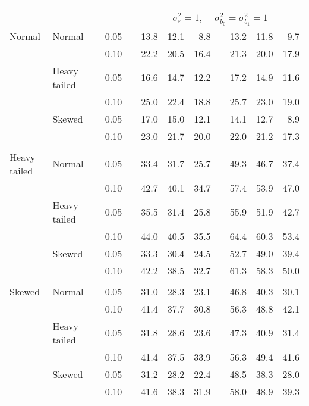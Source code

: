 \begin{table}[ht]
\begin{scriptsize}
\begin{tabular}{ll p{.1cm} c p{.1cm} rrr p{.1cm} rrr}
&&&&&&&&&&&\\
& && && \multicolumn{7}{c}{$\sigma_{\varepsilon}^2 = 1$, \ \ $\sigma_{b_0}^2 = \sigma_{b_1}^2 = 1$} \\ \cline{6-12}
 \rowcolor{gray!20} Normal & Normal &  & 0.05 &  & 13.8 & 12.1 & 8.8 &  & 13.2 & 11.8 & 9.7 \\ 
 \rowcolor{gray!20}  &  &  & 0.10 &  & 22.2 & 20.5 & 16.4 &  & 21.3 & 20.0 & 17.9 \\ 
 \rowcolor{gray!20}  & Heavy tailed &  & 0.05 &  & 16.6 & 14.7 & 12.2 &  & 17.2 & 14.9 & 11.6 \\ 
 \rowcolor{gray!20}  &  &  & 0.10 &  & 25.0 & 22.4 & 18.8 &  & 25.7 & 23.0 & 19.0 \\ 
 \rowcolor{gray!20}  & Skewed &  & 0.05 &  & 17.0 & 15.0 & 12.1 &  & 14.1 & 12.7 & 8.9 \\ 
 \rowcolor{gray!20}  &  &  & 0.10 &  & 23.0 & 21.7 & 20.0 &  & 22.0 & 21.2 & 17.3 \\ 
             &&&&&&&&&&&\\
  Heavy tailed & Normal &  & 0.05 &  & 33.4 & 31.7 & 25.7 &  & 49.3 & 46.7 & 37.4 \\ 
   &  &  & 0.10 &  & 42.7 & 40.1 & 34.7 &  & 57.4 & 53.9 & 47.0 \\ 
   & Heavy tailed &  & 0.05 &  & 35.5 & 31.4 & 25.8 &  & 55.9 & 51.9 & 42.7 \\ 
   &  &  & 0.10 &  & 44.0 & 40.5 & 35.5 &  & 64.4 & 60.3 & 53.4 \\ 
   & Skewed &  & 0.05 &  & 33.3 & 30.4 & 24.5 &  & 52.7 & 49.0 & 39.4 \\ 
   &  &  & 0.10 &  & 42.2 & 38.5 & 32.7 &  & 61.3 & 58.3 & 50.0 \\ 
             &&&&&&&&&&&\\
  Skewed & Normal &  & 0.05 &  & 31.0 & 28.3 & 23.1 &  & 46.8 & 40.3 & 30.1 \\ 
   &  &  & 0.10 &  & 41.4 & 37.7 & 30.8 &  & 56.3 & 48.8 & 42.1 \\ 
   & Heavy tailed &  & 0.05 &  & 31.8 & 28.6 & 23.6 &  & 47.3 & 40.9 & 31.4 \\ 
   &  &  & 0.10 &  & 41.4 & 37.5 & 33.9 &  & 56.3 & 49.4 & 41.6 \\ 
   & Skewed &  & 0.05 &  & 31.2 & 28.2 & 22.4 &  & 48.5 & 38.3 & 28.0 \\ 
   &  &  & 0.10 &  & 41.6 & 38.3 & 31.9 &  & 58.0 & 48.9 & 39.3 \\ 


\end{tabular}
\end{scriptsize}
\end{table}
